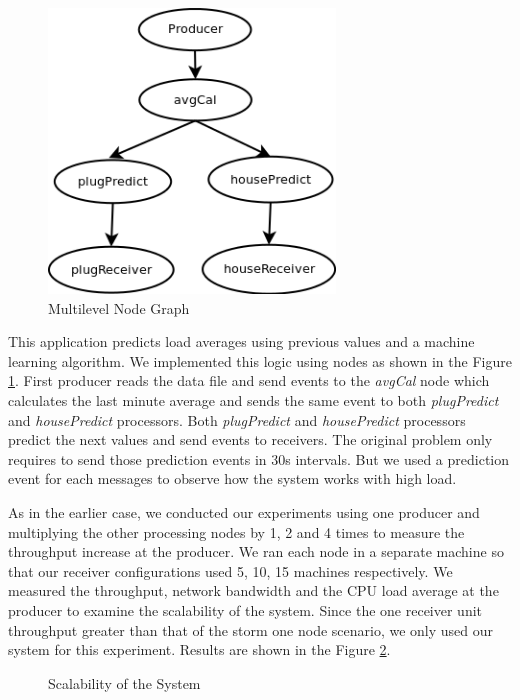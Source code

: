 \begin{figure}[!t]
        \centering
        \includegraphics[width=3.0in]{multigraph.png}
        \caption{Multilevel Node Graph}
        \label{multigraph}
\end{figure}

This application predicts load averages using previous values and a machine learning algorithm. We implemented this logic using nodes as shown in the Figure \ref{multigraph}. First producer reads the data file and send events to the \textit{avgCal} node which calculates the last minute average and sends the same event to both \textit{plugPredict} and \textit{housePredict} processors. Both \textit{plugPredict} and \textit{housePredict} processors predict the next values and send events to receivers. The original problem only requires to send those prediction events in 30s intervals. But we used a prediction event for each messages to observe how the system works with high load.
 
As in the earlier case, we conducted our experiments using one producer and multiplying the other processing nodes by 1, 2 and 4 times to measure the throughput increase at the producer. We ran each node in a separate machine so that our receiver configurations used 5, 10, 15 machines respectively. We measured the throughput,  network bandwidth and the CPU load average at the producer to examine the scalability of the system. Since the one receiver unit throughput greater than that of the storm one node scenario, we only used our system for this experiment.  Results are shown in the Figure \ref{scalability}.


\begin{figure}[!t]
        \centering
        \hfil
        \hfil
        \hfil
        \caption{Scalability of the System}
        \label{scalability}
\end{figure}


